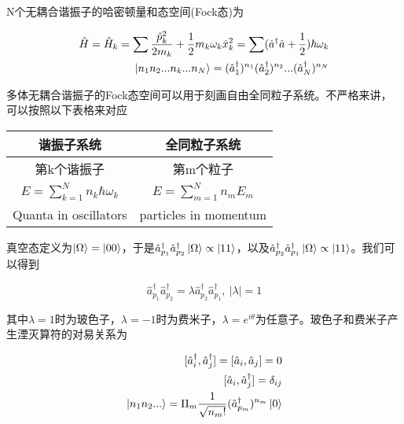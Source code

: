 N个无耦合谐振子的哈密顿量和态空间(Fock态)为

\begin{equation}
    \begin{split}
        \hat{H} = \hat{H}_k = \sum\frac{\hat{p}^2_k}{2m_k}+\frac{1}{2}m_k\omega_k\hat{x}_k^2 = \sum(\hat{a}^\dagger\hat{a}+\frac{1}{2})\hbar\omega_k \\
        \ket{n_1n_2...n_k...n_N}=(\hat{a}_1^\dagger)^{n_1}(\hat{a}_2^\dagger)^{n_2}...(\hat{a}_N^\dagger)^{n_N}
    \end{split}
\end{equation}

多体无耦合谐振子的Fock态空间可以用于刻画自由全同粒子系统。不严格来讲，可以按照以下表格来对应

\begin{center}
    \begin{tabular}{c|c}
        \hline
            谐振子系统 & 全同粒子系统 \\
        \hline
            第k个谐振子 & 第m个粒子 \\
        \hline
            $E=\sum_{k=1}^Nn_k\hbar\omega_k$ & $E=\sum_{m=1}^Nn_mE_m$ \\
        \hline
            Quanta in oscillators & particles in momentum \\
        \hline
        \end{tabular}
\end{center}

真空态定义为$\ket{\Omega}=\ket{00}$，于是$\hat{a}_{p_1}^\dagger\hat{a}_{p_2}^\dagger\ket{\Omega}\propto\ket{11}$，以及$\hat{a}_{p_2}^\dagger\hat{a}_{p_1}^\dagger\ket{\Omega}\propto\ket{11}$。我们可以得到

\begin{equation}
    \hat{a}_{p_1}^\dagger\hat{a}_{p_2}^\dagger=\lambda\hat{a}_{p_2}^\dagger\hat{a}_{p_1}^\dagger,\ |\lambda|=1
\end{equation}

其中$\lambda=1$时为玻色子，$\lambda=-1$时为费米子，$\lambda=e^{i\theta}$为任意子。玻色子和费米子产生湮灭算符的对易关系为

\begin{equation}
    \begin{split}
        [\hat{a}_i^\dagger,\hat{a}_j^\dagger]=[\hat{a}_i,\hat{a}_j]=0 \\
        [\hat{a}_i,\hat{a}_j^\dagger]=\delta_{ij} \\
        \ket{n_1n_2...}=\Pi_m\frac{1}{\sqrt{n_m!}}(\hat{a}_{p_m}^\dagger)^{n_m}\ket{0}
    \end{split}
\end{equation}

